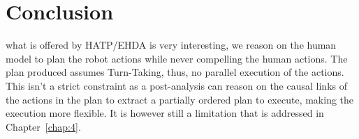 \section{Conclusion}

what is offered by HATP/EHDA is very interesting, we reason on the human model to plan the robot actions while never compelling the human actions. The plan produced assumes Turn-Taking, thus, no parallel execution of the actions. This isn't a strict constraint as a post-analysis can reason on the causal links of the actions in the plan to extract a partially ordered plan to execute, making the execution more flexible. It is however still a limitation that is addressed in Chapter~\ref{chap:4}.